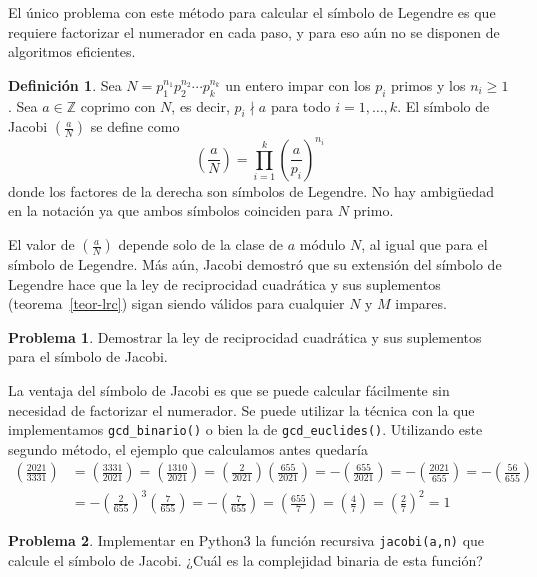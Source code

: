\documentclass[a4paper, 11pt]{article}
\newcommand{\ZZ}{\mathbb{Z}}
\newcounter{numerodetema}
\theoremstyle{plain}
\theoremstyle{definition}
\newtheorem{defi}[teor]{Definición}
\newtheorem{prob}{Problema}[numerodetema]
\begin{document}
\bigskip

El único problema con este método para calcular el símbolo de Legendre es que
requiere factorizar el numerador en cada paso, y para eso aún no se disponen de
algoritmos eficientes.

\begin{defi}
Sea $N=p_1^{n_1}p_2^{n_2}\cdots p_k^{n_k}$ un entero impar con los $p_i$ primos
y los $n_i\geq 1$. Sea $a\in\ZZ$ coprimo con $N$, es decir, $p_i\nmid a$ para
todo $i=1,\ldots,k$. El símbolo de Jacobi $\left(\frac{a}{N}\right)$ se define
como
\[
  \left(\frac{a}{N}\right)=\prod_{i=1}^k\left(\frac{a}{p_i}\right)^{n_i}
\]
donde los factores de la derecha son símbolos de Legendre. No hay ambigüedad
en la notación ya que ambos símbolos coinciden para $N$ primo.
\end{defi}

El valor de $\left(\frac{a}{N}\right)$ depende solo de la clase de $a$
módulo $N$, al igual que para el símbolo de Legendre. Más aún, Jacobi
demostró que su extensión del símbolo de Legendre hace que la ley de
reciprocidad cuadrática y sus suplementos (teorema~\ref{teor-lrc})
sigan siendo válidos para cualquier $N$ y $M$ impares.

\begin{prob}
Demostrar la ley de reciprocidad cuadrática y sus suplementos para el
símbolo de Jacobi.
\end{prob}

La ventaja del símbolo de Jacobi es que se puede calcular fácilmente
sin necesidad de factorizar el numerador. Se puede utilizar la
técnica con la que implementamos \texttt{gcd\_binario()} o bien la
de \texttt{gcd\_euclides()}. Utilizando este segundo método, el ejemplo
que calculamos antes quedaría
\[
\begin{aligned}
\left(\frac{2021}{3331}\right)&=\left(\frac{3331}{2021}\right)
=\left(\frac{1310}{2021}\right)=
\left(\frac{2}{2021}\right)\left(\frac{655}{2021}\right)=
-\left(\frac{655}{2021}\right)=-\left(\frac{2021}{655}\right)
=-\left(\frac{56}{655}\right) \\
&=-\left(\frac{2}{655}\right)^3\left(\frac{7}{655}\right)
=-\left(\frac{7}{655}\right)=\left(\frac{655}{7}\right)
=\left(\frac{4}{7}\right)=\left(\frac{2}{7}\right)^2=1
\end{aligned}
\]

\begin{prob}
Implementar en Python3 la función recursiva \texttt{jacobi(a,n)} que
calcule el símbolo de Jacobi. ¿Cuál es la complejidad binaria de esta
función?
\end{prob}
\end{document}

